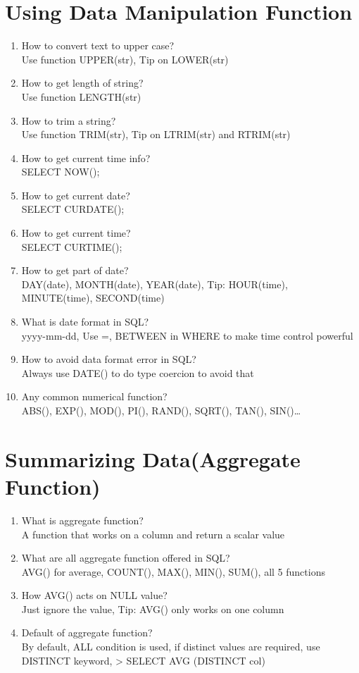 \documentclass[10pt,a4paper,oneside]{article}
\begin{document}
\section{Using Data Manipulation Function}
\begin{enumerate}[1.]
\item  How to convert text to upper case?  \\
Use function UPPER(str), Tip on LOWER(str)
\item  How to get length of string?  \\
Use function LENGTH(str)
\item   How to trim a string? \\
Use function TRIM(str), Tip on LTRIM(str) and RTRIM(str)
\item  How to get current time info?  \\
SELECT NOW();
\item How to get current date?   \\
SELECT CURDATE();
\item  How to get current time?  \\
SELECT CURTIME();
\item How to get part of date?   \\
DAY(date), MONTH(date), YEAR(date), Tip: HOUR(time), MINUTE(time), SECOND(time)
\item   What is date format in SQL? \\
yyyy-mm-dd, Use =, BETWEEN in WHERE to make time control powerful
\item  How to avoid data format error in SQL?  \\
Always use DATE() to do type coercion to avoid that
\item  Any common numerical function?  \\
ABS(), EXP(), MOD(), PI(), RAND(), SQRT(), TAN(), SIN()…
\end{enumerate}
\section{Summarizing Data(Aggregate Function)}
\begin{enumerate}[1.]
\item What is aggregate function?   \\
A function that works on a column and return a scalar value
\item  What are all aggregate function offered in SQL?  \\
AVG() for average, COUNT(), MAX(), MIN(), SUM(), all 5 functions
\item   How AVG() acts on NULL value? \\
Just ignore the value, Tip: AVG() only works on one column
\item  Default of aggregate function?  \\
By default, ALL condition is used, if distinct values are required, use DISTINCT keyword, > SELECT AVG (DISTINCT col) 
\end{enumerate}
\end{document}
